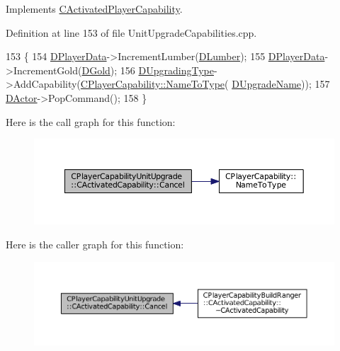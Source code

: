 Implements \hyperlink{classCActivatedPlayerCapability_a5cde83be468e262ad054d81e28684a81}{C\+Activated\+Player\+Capability}.



Definition at line 153 of file Unit\+Upgrade\+Capabilities.\+cpp.


\begin{DoxyCode}
153                                                              \{
154     \hyperlink{classCActivatedPlayerCapability_a9bf27c322a73f4b11c8183cc1973c3d8}{DPlayerData}->IncrementLumber(\hyperlink{classCPlayerCapabilityUnitUpgrade_1_1CActivatedCapability_aa4de5f57ea9d8dd85d7e6f62015c4a8d}{DLumber});
155     \hyperlink{classCActivatedPlayerCapability_a9bf27c322a73f4b11c8183cc1973c3d8}{DPlayerData}->IncrementGold(\hyperlink{classCPlayerCapabilityUnitUpgrade_1_1CActivatedCapability_a259a99f41ef918edf79f6827dec06559}{DGold});
156     \hyperlink{classCPlayerCapabilityUnitUpgrade_1_1CActivatedCapability_a028e222f2adc8a1035090487c93b358b}{DUpgradingType}->AddCapability(\hyperlink{classCPlayerCapability_a920a696526e8a839f728192aea0ba1c5}{CPlayerCapability::NameToType}(
      \hyperlink{classCPlayerCapabilityUnitUpgrade_1_1CActivatedCapability_acb0261591d692393b3c864d75edc799f}{DUpgradeName}));
157     \hyperlink{classCActivatedPlayerCapability_a54ca944b47bff2718330639941d402b0}{DActor}->PopCommand();
158 \}
\end{DoxyCode}
Here is the call graph for this function\+:\nopagebreak
\begin{figure}[H]
\begin{center}
\leavevmode
\includegraphics[width=350pt]{classCPlayerCapabilityUnitUpgrade_1_1CActivatedCapability_a29b41666081cf420e9f3b7d93c09920b_cgraph}
\end{center}
\end{figure}
Here is the caller graph for this function\+:\nopagebreak
\begin{figure}[H]
\begin{center}
\leavevmode
\includegraphics[width=350pt]{classCPlayerCapabilityUnitUpgrade_1_1CActivatedCapability_a29b41666081cf420e9f3b7d93c09920b_icgraph}
\end{center}
\end{figure}
